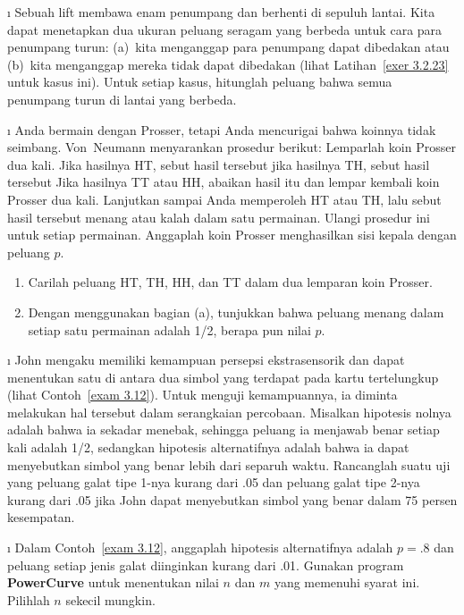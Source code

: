 \begin{LJSItem}
\i\label{exer 3.2.25} Sebuah lift membawa enam penumpang dan berhenti di
sepuluh lantai.  Kita dapat menetapkan dua ukuran peluang seragam yang berbeda untuk
cara para penumpang turun: (a)~kita menganggap para penumpang dapat dibedakan atau
(b)~kita menganggap mereka tidak dapat dibedakan (lihat Latihan~\ref{exer 3.2.23} untuk
kasus ini).  Untuk setiap kasus, hitunglah peluang bahwa semua penumpang turun di lantai
yang berbeda.

\i\label{exer 3.2.26} Anda bermain  dengan Prosser, tetapi Anda
mencurigai bahwa koinnya tidak seimbang.  Von~Neumann menyarankan prosedur berikut:
Lemparlah koin Prosser dua kali.  Jika hasilnya HT, sebut hasil tersebut  jika
hasilnya TH, sebut hasil tersebut  Jika hasilnya TT atau HH, abaikan hasil itu
dan lempar kembali koin Prosser dua kali.  Lanjutkan sampai Anda memperoleh HT atau TH,
lalu sebut hasil tersebut menang atau kalah dalam satu permainan.  Ulangi prosedur ini
untuk setiap permainan.  Anggaplah koin Prosser menghasilkan sisi kepala dengan peluang
$p$.
\begin{enumerate}
\item Carilah peluang HT, TH, HH, dan TT dalam dua lemparan koin Prosser.

\item Dengan menggunakan bagian (a), tunjukkan bahwa peluang menang dalam setiap satu
permainan adalah 1/2, berapa pun nilai $p$.
\end{enumerate}

\i\label{exer 3.2.27} John mengaku memiliki kemampuan persepsi ekstrasensorik dan dapat
menentukan satu di antara dua simbol yang terdapat pada kartu tertelungkup (lihat
Contoh~\ref{exam 3.12}).  Untuk menguji kemampuannya, ia diminta melakukan hal tersebut
dalam serangkaian percobaan.  Misalkan hipotesis nolnya adalah bahwa ia sekadar menebak,
sehingga peluang ia menjawab benar setiap kali adalah 1/2, sedangkan hipotesis
alternatifnya adalah bahwa ia dapat menyebutkan simbol yang benar lebih dari separuh
waktu.  Rancanglah suatu uji yang peluang galat tipe 1-nya kurang dari .05 dan peluang
galat tipe 2-nya kurang dari .05 jika John dapat menyebutkan simbol yang benar dalam 75
persen kesempatan.

\i\label{exer 3.2.28} Dalam Contoh~\ref{exam 3.12}, anggaplah hipotesis alternatifnya
adalah $p = .8$ dan peluang setiap jenis galat diinginkan kurang dari .01.  Gunakan
program {\bf PowerCurve} untuk menentukan nilai $n$ dan $m$ yang memenuhi syarat ini.
Pilihlah $n$ sekecil mungkin.


\end{LJSItem}
